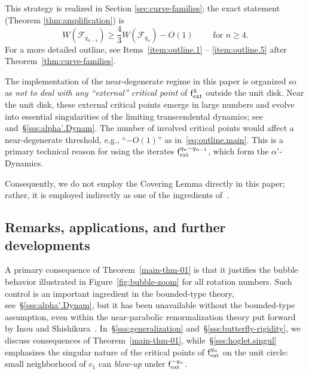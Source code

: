 \documentclass{amsart}
\begin{document}
This strategy is realized in Section \ref{sec:curve-families}; the exact statement (Theorem \ref{thm:amplification}) is
\begin{equation}
\label{eq:outline.main}
    W(\mathcal{F}_{q_{n-4}}) \geq \frac{4}{3} W(\mathcal{F}_{q_n}) - O(1) \qquad \text{ for } n \geq 4.
\end{equation}
For a more detailed outline, see Items~\ref{item:outline.1} -- \ref{item:outline.5} after Theorem~\ref{thm:curve-families}.

The implementation of the near-degenerate regime in this paper is organized so as \emph{not to deal with any ``external'' critical point} of $\mathsf{f}_{\textnormal{ext}}^k$ outside the unit disk. Near the unit disk, these external critical points emerge in large numbers and evolve into essential singularities of the limiting transcendental dynamics; see~\cite{DL23} and~\S\ref{sss:alpha'.Dynam}. The number of involved critical points would affect a near-degenerate threshold, e.g., ``$-O(1)$'' as in~\eqref{eq:outline.main}. This is a primary technical reason for using the iterates $\mathsf{f}_{\textnormal{ext}}^{q_n-q_{n-1}}$, which form the $\alpha'$-Dynamics. 

Consequently, we do not employ the Covering Lemma directly in this paper; rather, it is employed indirectly as one of the ingredients of~\cite{DL22}.

\subsection{Remarks, applications, and further developments}
\label{ss:applications} A primary consequence of Theorem~\ref{main-thm-01} is that it justifies the bubble behavior illustrated in Figure~\ref{fig:bubble-zoom} for all rotation numbers. Such control is an important ingredient in the bounded-type theory, see~\S\ref{sss:alpha'.Dynam}, but it has been unavailable without the bounded-type assumption, even within the near-parabolic renormalization theory put forward by Inou and Shishikura~\cite{IS}. In~\S\ref{sss:generalization} and~\S\ref{sss:butterfly-rigidity}, we discuss consequences of Theorem~\ref{main-thm-01}, while~\S\ref{sss:hoglet.singul} emphasizes the singular nature of the critical points of $\mathsf{f}_{\textnormal{ext}}^{q_n}$ on the unit circle: small neighborhood of $c_1$ can \emph{blow-up} under $\mathsf{f}_{\textnormal{ext}}^{-q_n}$.
\end{document}
